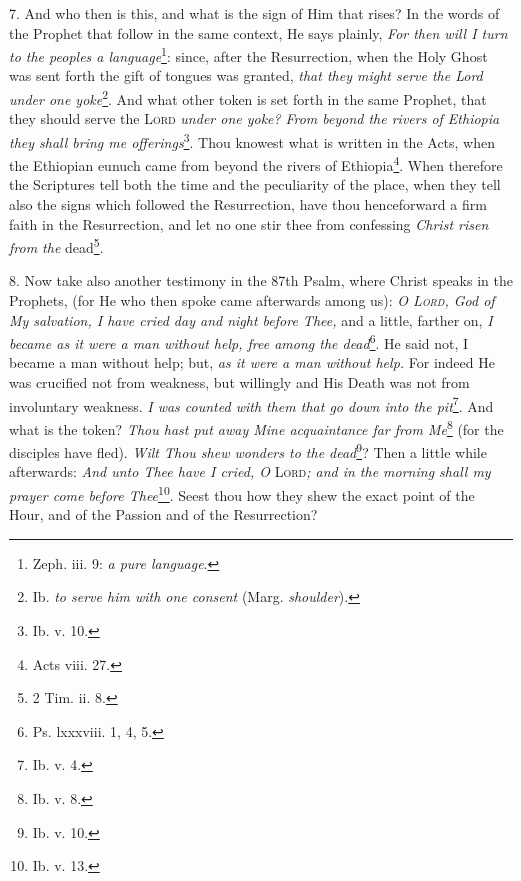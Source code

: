 7. And who then is this, and what is the sign of Him that rises? In the words of the Prophet that follow in the same context, He says plainly, \emph{For then will I turn to the peoples a language}\footnote{Zeph. iii. 9: \emph{a pure language}.}: since, after the Resurrection, when the Holy Ghost was sent forth the gift of tongues was granted, \emph{that they might serve the Lord under one yoke}\footnote{Ib. \emph{to serve him with one consent} (Marg. \emph{shoulder}).}. And what other token is set forth in the same Prophet, that they should serve the \textsc{Lord} \emph{under one yoke?} \emph{From beyond the rivers of Ethiopia they shall bring me offerings}\footnote{Ib. v. 10.}. Thou knowest what is written in the Acts, when the Ethiopian eunuch came from beyond the rivers of Ethiopia\footnote{Acts viii. 27.}. When therefore the Scriptures tell both the time and the peculiarity of the place, when they tell also the signs which followed the Resurrection, have thou henceforward a firm faith in the Resurrection, and let no one stir thee from confessing \emph{Christ risen from the} dead\footnote{2 Tim. ii. 8.}.

8. Now take also another testimony in the 87th Psalm, where Christ speaks in the Prophets, (for He who then spoke came afterwards among us): \emph{O \textsc{Lord}, God of My salvation, I have cried day and night before Thee,} and a little, farther on, \emph{I became as it were a man without help, free among the dead}\footnote{Ps. lxxxviii. 1, 4, 5.}. He said not, I became a man without help; but, \emph{as it were a man without help. } For indeed He was crucified not from weakness, but willingly and His Death was not from involuntary weakness. \emph{I was counted with them that go down into the pit}\footnote{Ib. v. 4.}. And what is the token? \emph{Thou hast put away Mine acquaintance far from Me}\footnote{Ib. v. 8.} (for the disciples have fled). \emph{Wilt Thou shew wonders to the dead}\footnote{Ib. v. 10.}? Then a little while afterwards: \emph{And unto Thee have I cried, O} \textsc{Lord}\emph{; and in the morning shall my prayer come before Thee}\footnote{Ib. v. 13.}. Seest thou how they shew the exact point of the Hour, and of the Passion and of the Resurrection?

